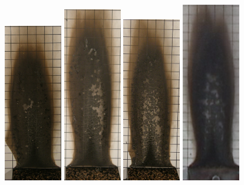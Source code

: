 \documentclass[twoside]{uocthesis}
\begin{document}
{\begin{figure}[p]
	\includegraphics[width=1.0in]{../Figures/GBNG29_P5130436}
	\includegraphics[width=1.0in]{../Figures/GBNG30_P5130445}
	\includegraphics[width=1.0in]{../Figures/GBNG31_P5130449}
	\includegraphics[width=1.0in]{../Figures/GBNG32}

\end{figure}}
\end{document}
